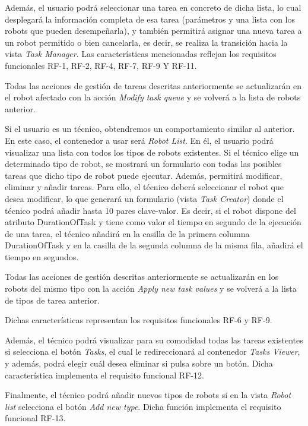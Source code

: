 Además, el usuario podrá seleccionar una tarea en concreto de dicha lista, lo cual desplegará la información completa de esa tarea (parámetros y una lista con los robots que pueden desempeñarla), y también permitirá asignar una nueva tarea a un robot permitido o bien cancelarla, es decir, se realiza la transición hacia la vista \textit{Task Manager}.
Las características mencionadas reflejan los requisitos funcionales RF-1, RF-2, RF-4, RF-7, RF-9 Y RF-11.

Todas las acciones de gestión de tareas descritas anteriormente se actualizarán en el robot afectado con la acción \textit{Modify task queue} y se volverá a la lista de robots anterior.

Si el usuario es un técnico, obtendremos un comportamiento similar al anterior. En este caso, el contenedor a usar será \textit{Robot List}. En él, el usuario podrá visualizar una lista con todos los tipos de robots existentes. Si el técnico elige un determinado tipo de robot, se mostrará un formulario con todas las posibles tareas que dicho tipo de robot puede ejecutar. Además, permitirá modificar, eliminar y añadir tareas. Para ello, el técnico deberá seleccionar el robot que desea modificar, lo que generará un formulario (vista \textit{Task Creator}) donde el técnico podrá añadir hasta 10 pares clave-valor. Es decir, si el robot dispone del atributo DurationOfTask y tiene como valor el tiempo en segundo de la ejecución de una tarea, el técnico añadirá en la casilla de la primera columna DurationOfTask y en la casilla de la segunda columna de la misma fila, añadirá el tiempo en segundos. 

Todas las acciones de gestión descritas anteriormente se actualizarán en los robots del mismo tipo con la acción \textit{Apply new task values} y se volverá a la lista de tipos de tarea anterior.

Dichas características representan los requisitos funcionales RF-6 y RF-9.

Además, el técnico podrá visualizar para su comodidad todas las tareas existentes si selecciona el botón \textit{Tasks}, el cual le redireccionará al contenedor \textit{Tasks Viewer}, y además, podrá elegir cuál desea eliminar si pulsa sobre un botón. Dicha característica implementa el requisito funcional RF-12.

Finalmente, el técnico podrá añadir nuevos tipos de robots si en la vista \textit{Robot list} selecciona el botón \textit{Add new type}. Dicha función implementa el requisito funcional RF-13.


